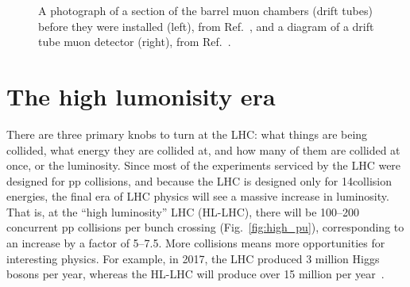 \begin{figure}[htb]
    \centering
    \quad
    \caption{
        A photograph of a section of the barrel muon chambers (drift tubes) before they were installed (left), from Ref.~\cite{Hoch:1274451}, and a diagram of a drift tube muon detector (right), from Ref.~\cite{CMSWebMuonDT}. 
    }
    \label{fig:cms_muon_DT}
\end{figure}

\clearpage

\section{The high lumonisity era}
There are three primary knobs to turn at the LHC: what things are being collided, what energy they are collided at, and how many of them are collided at once, or the luminosity. 
Since most of the experiments serviced by the LHC were designed for pp collisions, and because the LHC is designed only for 14\TeV collision energies, the final era of LHC physics will see a massive increase in luminosity. 
That is, at the ``high luminosity'' LHC (HL-LHC), there will be 100--200 concurrent pp collisions per bunch crossing (Fig.~\ref{fig:high_pu}), corresponding to an increase by a factor of 5--7.5.
More collisions means more opportunities for interesting physics. 
For example, in 2017, the LHC produced 3 million Higgs bosons per year, whereas the HL-LHC will produce over 15 million per year~\cite{HighLumiWebFacts}. 


